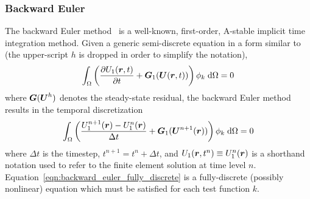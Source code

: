 \subsubsection{Backward Euler}\label{sec:backward_euler}
The backward Euler method~\cite{Butcher_2003} is a well-known, first-order, A-stable
implicit time integration method.  Given a generic
semi-discrete equation in a form similar to  (the upper-script $h$ is dropped in order to simplify the notation),
\begin{align}
  \int_{\Omega} \left(\frac{\partial U_1(\boldsymbol r,t)}{\partial t} + \boldsymbol G_1(\boldsymbol U(\boldsymbol r,t)) \right) \phi_k \; \text{d}{\Omega} = 0
\end{align}
where $\boldsymbol G(\boldsymbol U^h)$ denotes the steady-state residual, 
the backward Euler method results in the temporal discretization
\begin{align}
  \label{eqn:backward_euler_fully_discrete}
  \int_{\Omega} \left( \frac{U_1^{n+1}(\boldsymbol r) - U_1^n(\boldsymbol r)}{\Delta t} + \boldsymbol G_1(\boldsymbol U^{n+1}(\boldsymbol r)) \right) \phi_k \; \text{d}{\Omega} = 0
\end{align}
where $\Delta t$ is the timestep, $t^{n+1} = t^n + \Delta t$, and $U_1(\boldsymbol r, t^n)
\equiv U_1^n(\boldsymbol r)$ is a shorthand notation used to refer to the finite
element solution at time level
$n$. Equation~\eqref{eqn:backward_euler_fully_discrete} is a
fully-discrete (possibly nonlinear) equation which must be satisfied
for each test function $k$.

